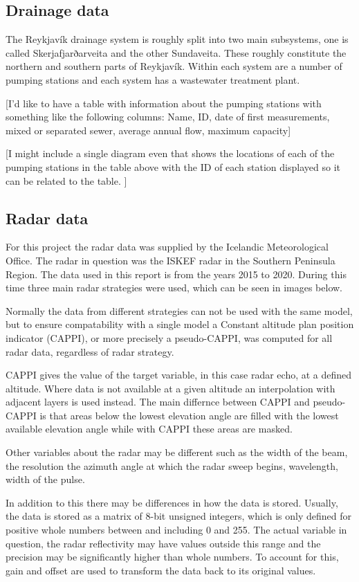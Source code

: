 \subsection{Drainage data}
The Reykjavík drainage system is roughly split into two main subsystems, one is called Skerjafjarðarveita and the other Sundaveita. These roughly constitute the northern and southern parts of Reykjavík. Within each system are a number of pumping stations and each system has a wastewater treatment plant. 

[I'd like to have a table with information about the pumping stations with something like the following columns: Name, ID, date of first measurements, mixed or separated sewer, average annual flow, maximum capacity]

[I might include a single diagram even that shows the locations of each of the pumping stations in the table above with the ID of each station displayed so it can be related to the table. ]

\subsection{Radar data}
For this project the radar data was supplied by the Icelandic Meteorological Office. The radar in question was the ISKEF radar in the Southern Peninsula Region. The data used in this report is from the years 2015 to 2020. During this time three main radar strategies were used, which can be seen in images below. 

Normally the data from different strategies can not be used with the same model, but to ensure compatability with a single model a Constant altitude plan position indicator (CAPPI), or more precisely a pseudo-CAPPI, was computed for all radar data, regardless of radar strategy. 

CAPPI gives the value of the target variable, in this case radar echo, at a defined altitude. Where data is not available at a given altitude an interpolation with adjacent layers is used instead. The main differnce between CAPPI and pseudo-CAPPI is that areas below the lowest elevation angle are filled with the lowest available elevation angle while with CAPPI these areas are masked. 

Other variables about the radar may be different such as the width of the beam, the resolution the azimuth angle at which the radar sweep begins, wavelength, width of the pulse. 

In addition to this there may be differences in how the data is stored. Usually, the data is stored as a matrix of 8-bit unsigned integers, which is only defined for positive whole numbers between and including 0 and 255. The actual variable in question, the radar reflectivity may have values outside this range and the precision may be significantly higher than whole numbers. To account for this, gain and offset are used to transform the data back to its original values. 


